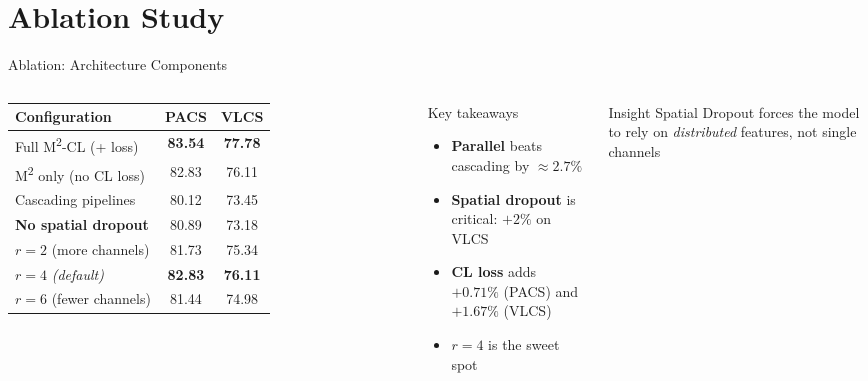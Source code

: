 \documentclass[aspectratio=169,10pt]{beamer}
\newcommand{\highlight}[1]{\textcolor{AccentOrange}{\textbf{#1}}}
\newcommand{\good}[1]{\textcolor{GreenOK}{\textbf{#1}}}
\begin{document}
\section{Ablation Study}

\begin{frame}{Ablation: Architecture Components}
  \begin{columns}[T]
      \small
      \begin{tabular}{@{}lcc@{}}
        \toprule
        \textbf{Configuration} & \textbf{PACS} & \textbf{VLCS} \\
        \midrule
        Full M\textsuperscript{2}-CL (+ loss)  & \good{83.54} & \good{77.78} \\
        M\textsuperscript{2} only (no CL loss) & 82.83        & 76.11 \\
        \midrule
        Cascading pipelines        & 80.12 & 73.45 \\
        \highlight{No spatial dropout}      & 80.89 & 73.18 \\
        \midrule
        $r=2$ (more channels)      & 81.73 & 75.34 \\
        $r=4$ \textit{(default)}   & \good{82.83} & \good{76.11} \\
        $r=6$ (fewer channels)     & 81.44 & 74.98 \\
        \bottomrule
      \end{tabular}

      \begin{block}{Key takeaways}
        \begin{itemize}
          \item \textbf{Parallel} beats cascading by $\approx 2.7\%$
          \item \textbf{Spatial dropout} is critical: $+2\%$ on VLCS
          \item \textbf{CL loss} adds $+0.71\%$ (PACS) and $+1.67\%$ (VLCS)
          \item $r=4$ is the sweet spot
        \end{itemize}
      \end{block}
      \vspace{0.3em}
      \begin{alertblock}{\small Insight}
        Spatial Dropout forces the model to rely on
        \textit{distributed} features, not single channels
      \end{alertblock}
  \end{columns}
\end{frame}
\end{document}
